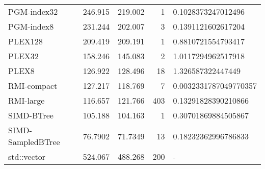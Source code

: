\begin{tabular}{lrrrl}
 PGM-index32       &               246.915  &              219.002  &            1 & 0.1028373247012496    \\
 PGM-index8        &               231.244  &              202.007  &            3 & 0.1391121602617204    \\
 PLEX128           &               209.419  &              209.191  &            1 & 0.8810721554793417    \\
 PLEX32            &               158.246  &              145.083  &            2 & 1.0117294962517918    \\
 PLEX8             &               126.922  &              128.496  &           18 & 1.326587322447449     \\
 RMI-compact       &               127.217  &              118.769  &            7 & 0.0032331787049770357 \\
 RMI-large         &               116.657  &              121.766  &          403 & 0.13291828390210866   \\
 SIMD-BTree        &               105.188  &              104.163  &            1 & 0.30701869884505867   \\
 SIMD-SampledBTree &                76.7902 &               71.7349 &           13 & 0.18232362996786833   \\
 std::vector       &               524.067  &              488.268  &          200 & -                     \\
\hline
\end{tabular}